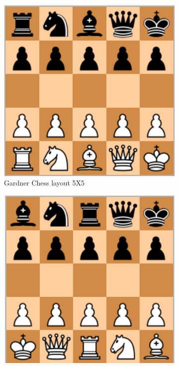 \documentclass[11pt]{article}
\begin{document}
%
%

\begin{figure}[h!]
  \centering
  \begin{subfigure}[b]{0.7\linewidth}
    \includegraphics[width=\linewidth]{gardner.png}
    \caption{Gardner Chess layout 5X5}
  \end{subfigure}
  \begin{subfigure}[b]{0.7\linewidth}
    \includegraphics[width=\linewidth]{jacobs.png}

\end{subfigure}
\end{figure}
\end{document}
